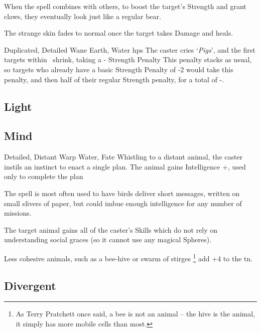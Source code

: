 \begin{multicols}{2}
{  When the spell combines with others, to boost the target's Strength and grant claws, they eventually look just like a regular bear.

  The strange skin fades to normal once the target takes Damage and heals.}

  {Duplicated, Detailed}%
  {Wane}%
  {Earth, Water}%
  {\glspl{hp}}%
  {The caster cries `\textit{Pigs}', and the first  targets within \spellRange\ shrink, taking a - Strength Penalty}%
  {
  This penalty stacks as usual, so targets who already have a basic Strength Penalty of -2 would take this penalty, and then half of their regular Strength penalty, for a total of -.}

\subsection{Light}


\subsection{Mind}

\label{carrierCrow}
  {Detailed, Distant}%
  {Warp}%
  {Water, Fate}%
  {}%
  {Whistling to a distant animal, the caster instils an instinct to enact a single plan.
  The animal gains Intelligence +, used only to complete the plan}%
  {
  The spell is most often used to have birds deliver short messages, written on small slivers of paper, but could imbue enough intelligence for any number of missions.

  The target animal gains all of the caster's Skills which do not rely on understanding social graces (so it cannot use any magical Spheres).

  Less cohesive animals, such as a bee-hive or swarm of stirges%
  \footnote{As Terry Pratchett once said, a bee is not an animal -- the hive is the animal, it simply has more mobile cells than most.}
  add +4 to the \gls{tn}.
  }


\subsection{Divergent}


\end{multicols}
